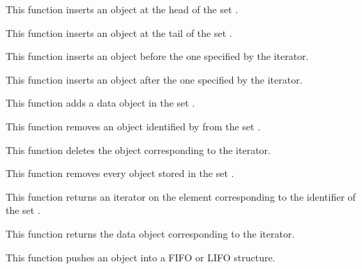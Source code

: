 	 {
	   This function inserts an object at the head of the set
	   .
	 }

	 {
	   This function inserts an object at the tail of the set
	   .
	 }

	 {
	   This function inserts an object before the one specified
	   by the iterator.
	 }

	 {
	   This function inserts an object after the one specified
	   by the iterator.
	 }

	 {
	   This function adds a data object in the set .
	 }

	 {
	   This function removes an object identified by 
	   from the set .
	 }

	 {
	   This function deletes the object corresponding to the iterator.
	 }

	 {
	   This function removes every object stored in the set
	   .
	 }

	 {
	   This function returns an iterator on the element corresponding
	   to the identifier  of the set .
	 }

	 {
	   This function returns the data object corresponding to
	   the iterator.
	 }

	 {
	   This function pushes an object into a FIFO or LIFO structure.
	 }

